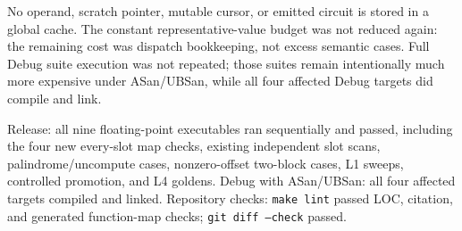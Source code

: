 \begin{figures}
\end{figures}

No operand, scratch pointer, mutable cursor, or emitted circuit is stored in a
global cache.  The constant representative-value budget was not reduced again:
the remaining cost was dispatch bookkeeping, not excess semantic cases.  Full
Debug suite execution was not repeated; those suites remain intentionally much
more expensive under ASan/UBSan, while all four affected Debug targets did
compile and link.

Release: all nine floating-point executables ran sequentially and passed,
including the four new every-slot map checks, existing independent slot scans,
palindrome/uncompute cases, nonzero-offset two-block cases, L1 sweeps,
controlled promotion, and L4 goldens.  Debug with ASan/UBSan: all four affected
targets compiled and linked.  Repository checks: \texttt{make lint} passed LOC,
citation, and generated function-map checks; \texttt{git diff --check} passed.

